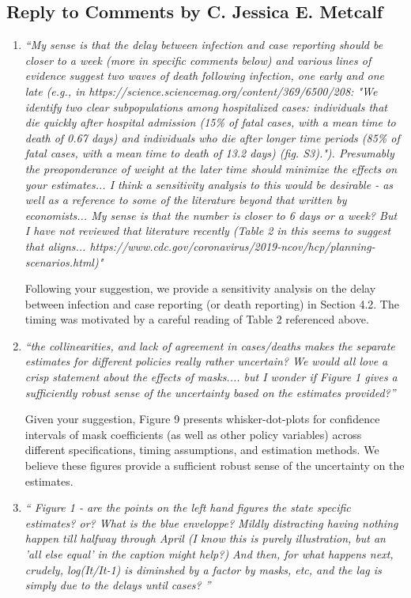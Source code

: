 \documentclass[11pt]{article}
\begin{document}
\subsection*{Reply to Comments  by C. Jessica E. Metcalf }
\begin{enumerate}

\item  \textit{``My sense is that the delay between infection and case reporting should be closer to a week (more in specific comments below) and various lines of evidence suggest two waves of death following infection, one early and one late (e.g., in https://science.sciencemag.org/content/369/6500/208: "We identify two clear subpopulations among hospitalized cases: individuals that die quickly after hospital admission (15\% of fatal cases, with a mean time to death of 0.67 days) and individuals who die after longer time periods (85\% of fatal cases, with a mean time to death of 13.2 days) (fig. S3)."). Presumably the preoponderance of weight at the later time should minimize the effects on your estimates... I think a sensitivity analysis to this would be desirable - as well as a reference to some of the literature beyond that written by economists... My sense is that the number is closer to 6 days or a week? But I have not reviewed that literature recently (Table 2 in this seems to suggest that aligns... https://www.cdc.gov/coronavirus/2019-ncov/hcp/planning-scenarios.html)"}

Following your suggestion,   we provide a sensitivity analysis on the delay between infection and case reporting (or death reporting) in Section 4.2. The timing was motivated by a careful reading of Table 2 referenced above.

\item \textit{``the collinearities, and lack of agreement in cases/deaths makes the separate estimates for different policies really rather uncertain? We would all love a crisp statement about the effects of masks.... but I wonder if Figure 1 gives a sufficiently robust sense of the uncertainty  based on the estimates provided?''}
 
Given  your suggestion, Figure 9 presents whisker-dot-plots for confidence intervals of mask coefficients (as well as other policy variables) across different specifications, timing assumptions, and estimation methods. We believe these figures provide a sufficient robust sense of the uncertainty on the  estimates. 
  
\item \textit{`` Figure 1 - are the points on the left hand figures the state specific estimates? or? What is the blue enveloppe? Mildly distracting having nothing happen till halfway through April (I know this is purely illustration, but an 'all else equal' in the caption might help?) And then, for what happens next, crudely, log(It/It-1) is diminshed by a factor by masks, etc, and the lag is simply due to the delays until cases? ''}
 

\end{enumerate}
\end{document}
